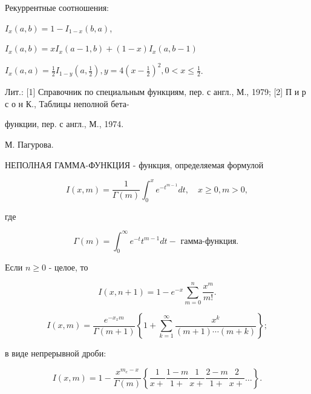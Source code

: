 \documentclass[10pt]{article}
\begin{document}
Рекуррентные соотношения:



$I_{x}(a, b)=1-I_{1-x}(b, a)$,



$I_{x}(a, b)=x I_{x}(a-1, b)+(1-x) I_{x}(a, b-1)$



$I_{x}(a, a)=\frac{1}{2} I_{1-y}\left(a, \frac{1}{2}\right), y=4\left(x-\frac{1}{2}\right)^{2}, 0<x \leqslant \frac{1}{2}$.



Лит.: [1] Справочник по специальным функциям, пер. с англ., М., 1979; [2] П и р с о н К., Таблицы неполной бета-

функции, пер. с англ., М., 1974.

М. Пагурова.



НЕПОЛНАЯ ГАММА-ФУНКЦИЯ - функция, определяемая формулой



\[

I(x, m)=\frac{1}{\Gamma(m)} \int_{0}^{x} e^{-t^{m-1}} d t, \quad x \geqslant 0, m>0,

\]



где



\[

\Gamma(m)=\int_{0}^{\infty} e^{-t} t^{m-1} d t-\text { гамма-функция. }

\]



Если $n \geqslant 0$ - целое, то



\[

I(x, n+1)=1-e^{-x} \sum_{m=0}^{n} \frac{x^{m}}{m !} .

\]



\[

I(x, m)=\frac{e^{-x_{x} m}}{\Gamma(m+1)}\left\{1+\sum_{k=1}^{\infty} \frac{x^{k}}{(m+1) \cdots(m+k)}\right\} ;

\]



в виде непрерывной дроби:



\[

I(x, m)=1-\frac{x^{m_{e}-x}}{\Gamma(m)}\left\{\frac{1}{x+} \frac{1-m}{1+} \frac{1}{x+} \frac{2-m}{1+} \frac{2}{x+} \ldots\right\} .

\]
\end{document}
